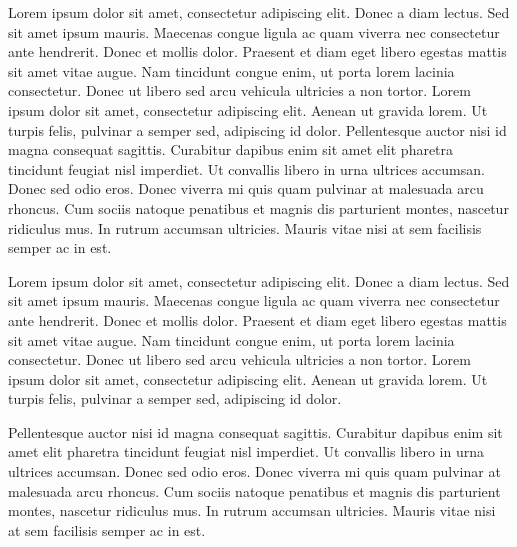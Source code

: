 Lorem ipsum dolor sit amet, consectetur adipiscing elit. Donec a diam lectus. Sed sit amet ipsum mauris. Maecenas
congue ligula ac quam viverra nec consectetur ante hendrerit. Donec et mollis dolor. Praesent et diam eget libero
egestas mattis sit amet vitae augue. Nam tincidunt congue enim, ut porta lorem lacinia consectetur. Donec ut libero sed
arcu vehicula ultricies a non tortor. Lorem ipsum dolor sit amet, consectetur adipiscing elit. Aenean ut gravida lorem.
Ut turpis felis, pulvinar a semper sed, adipiscing id dolor. Pellentesque auctor nisi id magna consequat sagittis.
Curabitur dapibus enim sit amet elit pharetra tincidunt feugiat nisl imperdiet. Ut convallis libero in urna ultrices
accumsan. Donec sed odio eros. Donec viverra mi quis quam pulvinar at malesuada arcu rhoncus. Cum sociis natoque
penatibus et magnis dis parturient montes, nascetur ridiculus mus. In rutrum accumsan ultricies. Mauris vitae nisi at
sem facilisis semper ac in est.

Lorem ipsum dolor sit amet, consectetur adipiscing elit. Donec a diam lectus. Sed sit amet ipsum mauris. Maecenas
congue ligula ac quam viverra nec consectetur ante hendrerit. Donec et mollis dolor. Praesent et diam eget libero
egestas mattis sit amet vitae augue. Nam tincidunt congue enim, ut porta lorem lacinia consectetur. Donec ut libero sed
arcu vehicula ultricies a non tortor. Lorem ipsum dolor sit amet, consectetur adipiscing elit. Aenean ut gravida lorem.
Ut turpis felis, pulvinar a semper sed, adipiscing id dolor.

Pellentesque auctor nisi id magna consequat sagittis. Curabitur dapibus enim sit amet elit pharetra tincidunt feugiat
nisl imperdiet. Ut convallis libero in urna ultrices accumsan. Donec sed odio eros. Donec viverra mi quis quam pulvinar
at malesuada arcu rhoncus. Cum sociis natoque penatibus et magnis dis parturient montes, nascetur ridiculus mus. In
rutrum accumsan ultricies. Mauris vitae nisi at sem facilisis semper ac in est.
